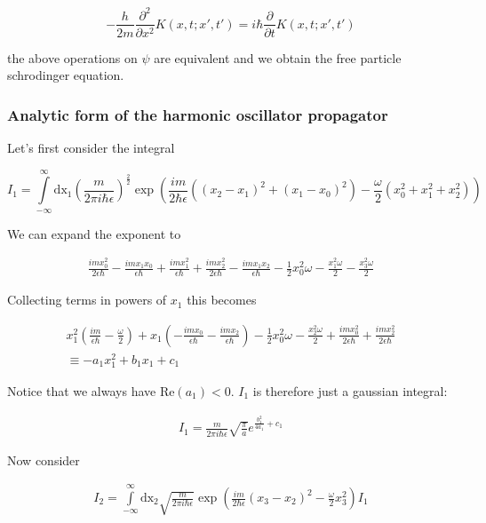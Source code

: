\documentclass[12pt]{article}
\begin{document}
\[ -\frac{h}{2m}\frac{\partial^2}{\partial x^2}K(x,t;x',t') = i\hbar\frac{\partial}{\partial t}K(x,t;x',t')
\]

the above operations on \(\psi\) are equivalent and we obtain the free particle schrodinger equation.

\subsubsection*{Analytic form of the harmonic oscillator propagator}

Let's first consider the integral

\newcommand{\intxf}[1]{\int\limits_{-\infty}^{\infty}\mathrm{dx_#1}}
\newcommand{\expp}[1]{\exp\left(#1\right)}

\[I_1 = \intxf{1}\left(\frac{m}{2\pi i \hbar \epsilon}\right)^{\frac{2}{2}}\expp{\frac{im}{2\hbar\epsilon}\left((x_2-x_1)^2+(x_1-x_0)^2\right)-\frac{\omega}{2}(x_0^2+x_1^2+x_2^2)}
\]

We can expand the exponent to

\begin{align*}
\frac{i m x_0^2}{2 \epsilon  \hbar }-\frac{i m x_1
   x_0}{\epsilon  \hbar }+\frac{i m x_1^2}{\epsilon  \hbar
   }+\frac{i m x_2^2}{2 \epsilon  \hbar }-\frac{i m x_1
   x_2}{\epsilon  \hbar }-\frac{1}{2} x_0^2 \omega
   -\frac{x_1^2 \omega }{2}-\frac{x_3^2 \omega }{2}
\end{align*}

Collecting terms in powers of \(x_1\) this becomes

\begin{align*}
x_1^2 \left(\frac{i m}{\epsilon  \hbar }-\frac{\omega
   }{2}\right)+x_1 \left(-\frac{i m
   x_0}{\epsilon  \hbar }-\frac{i m x_2}{\epsilon  \hbar
   }\right)-\frac{1}{2} x_0^2 \omega -\frac{x_2^2 \omega
   }{2}+\frac{i m x_0^2}{2 \epsilon  \hbar }+\frac{i
   m x_2^2}{2 \epsilon  \hbar }\\[6pt]
%
\equiv -a_1x_1^2+b_1x_1+c_1
\end{align*}

Notice that we always have \(\mathrm{Re}(a_1) < 0\). \(I_1\) is therefore just a gaussian integral:

\begin{align*}
I_1 = \frac{m}{2\pi i \hbar \epsilon}\sqrt{\frac{\pi}{a}}e^{\frac{b_1^2}{4a_1}+c_1}
\end{align*}

Now consider

\begin{align*}
I_2 = \intxf{2}\sqrt{\frac{m}{2\pi i \hbar \epsilon}}\expp{\frac{im}{2\hbar\epsilon}(x_3-x_2)^2-\frac{\omega}{2}x_3^2}  I_1
\end{align*}
\end{document}
